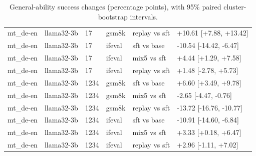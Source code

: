 \begin{table}[t]
\begin{tabular}{llllll}
mt\_de-en & llama32-3b & 17 & gsm8k & replay vs sft & +10.61 [+7.88, +13.42] \\
mt\_de-en & llama32-3b & 17 & ifeval & sft vs base & -10.54 [-14.42, -6.47] \\
mt\_de-en & llama32-3b & 17 & ifeval & mix5 vs sft & +4.44 [+1.29, +7.58] \\
mt\_de-en & llama32-3b & 17 & ifeval & replay vs sft & +1.48 [-2.78, +5.73] \\
mt\_de-en & llama32-3b & 1234 & gsm8k & sft vs base & +6.60 [+3.49, +9.78] \\
mt\_de-en & llama32-3b & 1234 & gsm8k & mix5 vs sft & -2.65 [-4.47, -0.76] \\
mt\_de-en & llama32-3b & 1234 & gsm8k & replay vs sft & -13.72 [-16.76, -10.77] \\
mt\_de-en & llama32-3b & 1234 & ifeval & sft vs base & -10.91 [-14.60, -6.84] \\
mt\_de-en & llama32-3b & 1234 & ifeval & mix5 vs sft & +3.33 [+0.18, +6.47] \\
mt\_de-en & llama32-3b & 1234 & ifeval & replay vs sft & +2.96 [-1.11, +7.02] \\
\bottomrule
\end{tabular}
\caption{General-ability success changes (percentage points), with 95\% paired cluster-bootstrap intervals.}
\end{table}
